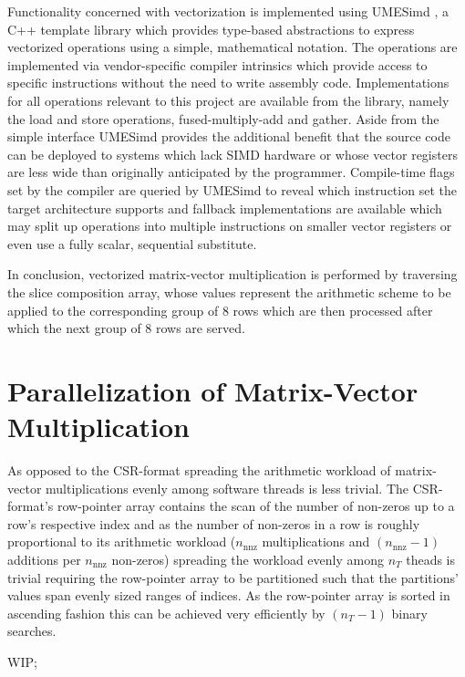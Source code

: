       Functionality concerned with vectorization is implemented using UMESimd \cite{umesimd2017}, a C++ template library
      which provides type-based abstractions to express vectorized operations using a simple, mathematical notation. The
      operations are implemented via vendor-specific compiler intrinsics which provide access to specific instructions
      without the need to write assembly code. Implementations for all operations relevant to this project are available
      from the library, namely the load and store operations, fused-multiply-add and gather. Aside from the simple
      interface UMESimd provides the additional benefit that the source code can be deployed to systems which lack SIMD
      hardware or whose vector registers are less wide than originally anticipated by the programmer. Compile-time flags
      set by the compiler are queried by UMESimd to reveal which instruction set the target architecture supports and
      fallback implementations are available which may split up operations into multiple instructions on smaller vector
      registers or even use a fully scalar, sequential substitute.

      In conclusion, vectorized matrix-vector multiplication is performed by traversing the slice composition array,
      whose values represent the arithmetic scheme to be applied to the corresponding group of $8$ rows which are then
      processed after which the next group of $8$ rows are served.




    \section{Parallelization of Matrix-Vector Multiplication}

      As opposed to the CSR-format spreading the arithmetic workload of matrix-vector multiplications evenly among
      software threads is less trivial. The CSR-format's row-pointer array contains the scan of the number of non-zeros
      up to a row's respective index and as the number of non-zeros in a row is roughly proportional to its arithmetic
      workload ($n_\text{nnz}$ multiplications and $(n_\text{nnz} - 1)$ additions per $n_\text{nnz}$ non-zeros)
      spreading the workload evenly among $n_T$ theads is trivial requiring the row-pointer array to be partitioned such
      that the partitions' values span evenly sized ranges of indices. As the row-pointer array is sorted in ascending
      fashion this can be achieved very efficiently by $(n_T - 1)$ binary searches.

      WIP;


